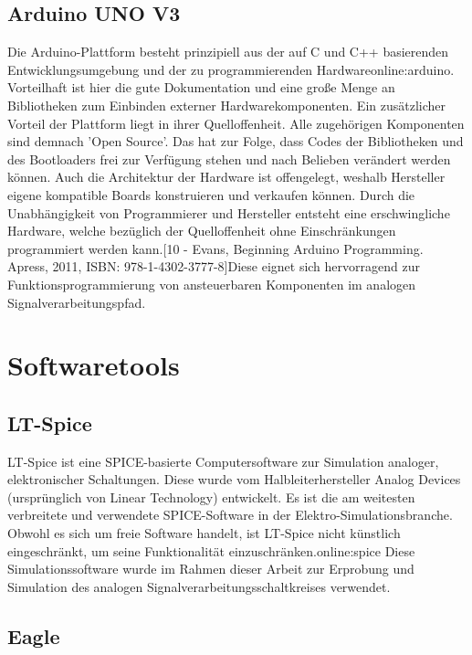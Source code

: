 \subsection{Arduino UNO V3}
\label{subsec:unov3}

Die Arduino-Plattform besteht prinzipiell aus der auf C und C++ basierenden Entwicklungsumgebung und der zu programmierenden Hardware\gls{online:arduino}. Vorteilhaft ist hier die gute Dokumentation und eine große Menge an Bibliotheken zum Einbinden externer Hardwarekomponenten. Ein zusätzlicher Vorteil der Plattform liegt in ihrer Quelloffenheit. Alle zugehörigen Komponenten sind demnach 'Open Source'. Das hat zur Folge, dass Codes der Bibliotheken und des Bootloaders frei zur Verfügung stehen und nach Belieben verändert werden können. Auch die Architektur der Hardware ist offengelegt, weshalb Hersteller eigene kompatible Boards konstruieren und verkaufen können. Durch die Unabhängigkeit von Programmierer und Hersteller entsteht eine erschwingliche Hardware, welche bezüglich der Quelloffenheit ohne Einschränkungen programmiert werden kann.[10 - Evans, Beginning Arduino Programming. Apress, 2011, ISBN: 978-1-4302-3777-8]Diese eignet sich hervorragend zur Funktionsprogrammierung von ansteuerbaren Komponenten im analogen Signalverarbeitungspfad.

\section{Softwaretools}       
\subsection{LT-Spice}
\label{subsec:lts}
LT-Spice ist eine SPICE-basierte Computersoftware zur Simulation analoger, elektronischer Schaltungen. Diese wurde vom Halbleiterhersteller Analog Devices (ursprünglich von Linear Technology) entwickelt. Es ist die am weitesten verbreitete und verwendete SPICE-Software in der Elektro-Simulationsbranche. Obwohl es sich um freie Software handelt, ist LT-Spice nicht künstlich eingeschränkt, um seine Funktionalität einzuschränken.\gls{online:spice} Diese Simulationssoftware wurde im Rahmen dieser Arbeit zur Erprobung und Simulation des analogen Signalverarbeitungsschaltkreises verwendet.

\subsection{Eagle}
\label{subsec:eagle}

